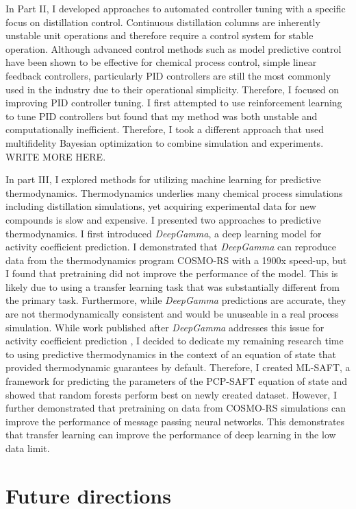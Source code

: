 In Part II, I developed approaches to automated controller tuning with a specific focus on distillation control. Continuous distillation columns are inherently unstable unit operations and therefore require a control system for stable operation. Although advanced control methods such as model predictive control have been shown to be effective for chemical process control, simple linear feedback controllers, particularly PID controllers are still the most commonly used in the industry due to their operational simplicity. Therefore, I focused on improving PID controller tuning. I first attempted to use reinforcement learning to tune PID controllers but found that my method was both unstable and computationally inefficient. Therefore, I took a different approach that used multifidelity Bayesian optimization to combine simulation and experiments.  WRITE MORE HERE.

In part III, I explored methods for utilizing machine learning for predictive thermodynamics. Thermodynamics underlies many chemical process simulations including distillation simulations, yet acquiring experimental  data for new compounds is slow and expensive. I presented two approaches to predictive thermodynamics.  I first introduced \textit{DeepGamma}, a deep learning model for activity coefficient prediction. I demonstrated that \textit{DeepGamma} can reproduce data from the thermodynamics program COSMO-RS with a 1900x speed-up, but I found that pretraining  did not improve the performance of the model. This is likely due to using a transfer learning task that was substantially different from the primary task. Furthermore, while \textit{DeepGamma} predictions are accurate, they are not thermodynamically consistent and would be unuseable in a real process simulation. While work published after \textit{DeepGamma} addresses this issue for activity coefficient prediction \cite{Winter2022, SanchezMedina2023}, I decided to dedicate my remaining research time to using predictive thermodynamics in the context of an equation of state that provided thermodynamic guarantees by default. Therefore, I created ML-SAFT, a framework for predicting the parameters of the PCP-SAFT equation of state and showed that random forests perform best on newly created dataset. However, I further demonstrated that pretraining on data from COSMO-RS simulations can improve the performance of message passing neural networks. This demonstrates that transfer learning can improve the performance of deep learning in the low data limit.

\section{Future directions}

